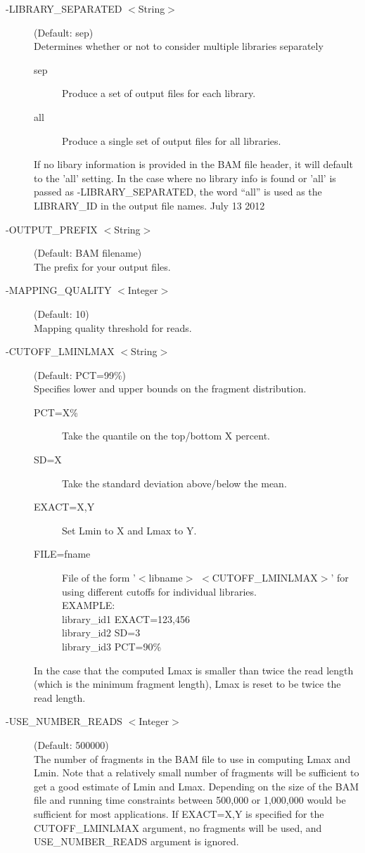 \documentclass[11pt]{article}
\begin{document}
\begin{description}
\item[-LIBRARY\_SEPARATED $<$String$>$] (Default: sep)\\
Determines whether or not to consider multiple libraries separately
\begin{description}
\item[sep] Produce a set of output files for each library.
\item[all] Produce a single set of output files for all libraries.
\end{description}
If no libary information is provided in the BAM file header, it will default to the 'all' setting. In the case where no library info is found or 'all' is passed as -LIBRARY\_SEPARATED, the word ``all'' is used as the LIBRARY\_ID in the output file names.
July 13 2012
\item[-OUTPUT\_PREFIX $<$String$>$] (Default: BAM filename)\\
The prefix for your output files.

\item[-MAPPING\_QUALITY $<$Integer$>$] (Default: 10) \\
Mapping quality threshold for reads.

\item[-CUTOFF\_LMINLMAX $<$String$>$] (Default: PCT=99\%)\\
Specifies lower and upper bounds on the fragment distribution.
\begin{description}
\item[PCT=X\%] Take the quantile on the top/bottom X percent. 
\item[SD=X] Take the standard deviation above/below the mean.
\item[EXACT=X,Y] Set Lmin to X and Lmax to Y.
\item[FILE=fname] File of the form '$<$libname$>$ $<$CUTOFF\_LMINLMAX$>$' for using different cutoffs for individual libraries.\\
\noindent EXAMPLE: \\
\noindent library\_id1 EXACT=123,456\\
\noindent library\_id2 SD=3\\
\noindent library\_id3 PCT=90\%
\end{description}
In the case that the computed Lmax is smaller than twice the read length (which is the minimum fragment length), Lmax is reset to be twice the read length.

\item[-USE\_NUMBER\_READS $<$Integer$>$] (Default: 500000)\\
The number of fragments in the BAM file to use in computing Lmax and Lmin. Note that a relatively small number of fragments will be sufficient to get a good estimate of Lmin and Lmax.
Depending on the size of the BAM file and running time
constraints between 500,000 or 1,000,000 would be
sufficient for most applications. If EXACT=X,Y is 
specified for the CUTOFF\_LMINLMAX argument, no fragments
will be used, and USE\_NUMBER\_READS argument is ignored. 


\end{description}
\end{document}

